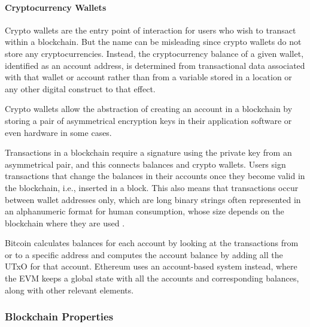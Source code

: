 \documentclass[../access.tex]{subfiles}
\begin{document}
    \paragraph{Cryptocurrency Wallets}
        \label{cryptocurrency-wallets}
        Crypto wallets are the entry point of interaction for users who wish to transact within a blockchain. But the name can be misleading since crypto wallets do not store any cryptocurrencies. Instead, the cryptocurrency balance of a given wallet, identified as an account address, is determined from transactional data associated with that wallet or account rather than from a variable stored in a location or any other digital construct to that effect.
        \par
        Crypto wallets allow the abstraction of creating an account in a blockchain by storing a pair of asymmetrical encryption keys in their application software or even hardware in some cases.
        \par
        Transactions in a blockchain require a signature using the private key from an asymmetrical pair, and this connects balances and crypto wallets. Users sign transactions that change the balances in their accounts once they become valid in the blockchain, i.e., inserted in a block. This also means that transactions occur between wallet addresses only, which are long binary strings often represented in an alphanumeric format for human consumption, whose size depends on the blockchain where they are used \cite{Suratkar2020}.
        \par
        Bitcoin calculates balances for each account by looking at the transactions from or to a specific address and computes the account balance by adding all the UTxO for that account. Ethereum uses an account-based system instead, where the EVM keeps a global state with all the accounts and corresponding balances, along with other relevant elements.
    
    \subsubsection{Blockchain Properties}
\end{document}
